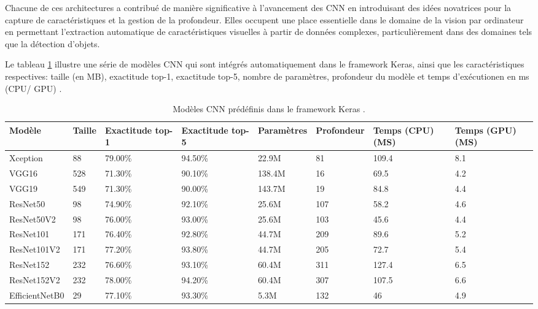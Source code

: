 Chacune de ces architectures a contribué de manière significative à l'avancement des CNN en introduisant des idées novatrices pour la capture de caractéristiques et la gestion de la profondeur. Elles occupent une place essentielle dans le domaine de la vision par ordinateur en permettant l'extraction automatique de caractéristiques visuelles à partir de données complexes, particulièrement dans des domaines tels que la détection d'objets.

Le tableau \ref{tab:my-table} illustre une série de modèles CNN qui sont intégrés automatiquement dans le framework Keras, ainsi que les caractéristiques respectives: taille (en MB), exactitude top-1, exactitude top-5, nombre de paramètres, profondeur du modèle et temps d'exécutionen en ms (CPU/ GPU) \cite{ch2_KerasApp87}.

\begin{table}[h]
\centering
\caption{Modèles CNN prédéfinis dans le framework Keras \cite{ch2_KerasApp87}.}
\label{tab:my-table}
\resizebox{\columnwidth}{!}
{
    \begin{tabular}{|l|l|l|l|l|l|p{2cm}|p{2cm}|}
    \hline
    Modèle & Taille & Exactitude top-1 & Exactitude top-5  & Paramètres & Profondeur & Temps (CPU)(MS) & Temps (GPU)(MS) \\
    \hline
    Xception          & 88     & 79.00\% & 94.50\% & 22.9M  & 81  & 109.4  & 8.1  \\
    VGG16             & 528    & 71.30\% & 90.10\% & 138.4M & 16  & 69.5   & 4.2  \\
    VGG19             & 549    & 71.30\% & 90.00\% & 143.7M & 19  & 84.8   & 4.4  \\
    ResNet50          & 98     & 74.90\% & 92.10\% & 25.6M  & 107 & 58.2   & 4.6  \\
    ResNet50V2        & 98     & 76.00\% & 93.00\% & 25.6M  & 103 & 45.6   & 4.4  \\
    ResNet101         & 171    & 76.40\% & 92.80\% & 44.7M  & 209 & 89.6   & 5.2  \\
    ResNet101V2       & 171    & 77.20\% & 93.80\% & 44.7M  & 205 & 72.7   & 5.4  \\
    ResNet152         & 232    & 76.60\% & 93.10\% & 60.4M  & 311 & 127.4  & 6.5  \\
    ResNet152V2       & 232    & 78.00\% & 94.20\% & 60.4M  & 307 & 107.5  & 6.6  \\
    EfficientNetB0    & 29     & 77.10\% & 93.30\% & 5.3M   & 132 & 46     & 4.9  \\
    \hline  
    \end{tabular}   
}
\end{table}

